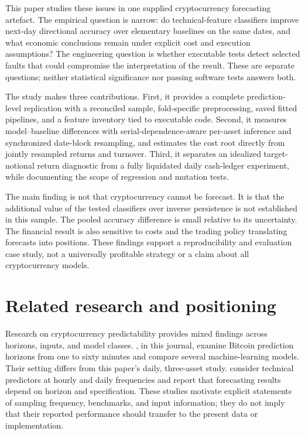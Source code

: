 \documentclass[preprint,12pt,authoryear]{elsarticle}
\begin{document}
This paper studies these issues in one supplied cryptocurrency forecasting artefact. The empirical question is narrow: do technical-feature classifiers improve next-day directional accuracy over elementary baselines on the same dates, and what economic conclusions remain under explicit cost and execution assumptions? The engineering question is whether executable tests detect selected faults that could compromise the interpretation of the result. These are separate questions; neither statistical significance nor passing software tests answers both.

The study makes three contributions. First, it provides a complete prediction-level replication with a reconciled sample, fold-specific preprocessing, saved fitted pipelines, and a feature inventory tied to executable code. Second, it measures model--baseline differences with serial-dependence-aware per-asset inference and synchronized date-block resampling, and estimates the cost root directly from jointly resampled returns and turnover. Third, it separates an idealized target-notional return diagnostic from a fully liquidated daily cash-ledger experiment, while documenting the scope of regression and mutation tests.

The main finding is not that cryptocurrency cannot be forecast. It is that the additional value of the tested classifiers over inverse persistence is not established in this sample. The pooled accuracy difference is small relative to its uncertainty. The financial result is also sensitive to costs and the trading policy translating forecasts into positions. These findings support a reproducibility and evaluation case study, not a universally profitable strategy or a claim about all cryptocurrency models.

\section{Related research and positioning}
Research on cryptocurrency predictability provides mixed findings across horizons, inputs, and model classes. \citet{jaquart2021}, in this journal, examine Bitcoin prediction horizons from one to sixty minutes and compare several machine-learning models. Their setting differs from this paper's daily, three-asset study. \citet{gradojevic2023} consider technical predictors at hourly and daily frequencies and report that forecasting results depend on horizon and specification. These studies motivate explicit statements of sampling frequency, benchmarks, and input information; they do not imply that their reported performance should transfer to the present data or implementation.
\end{document}
